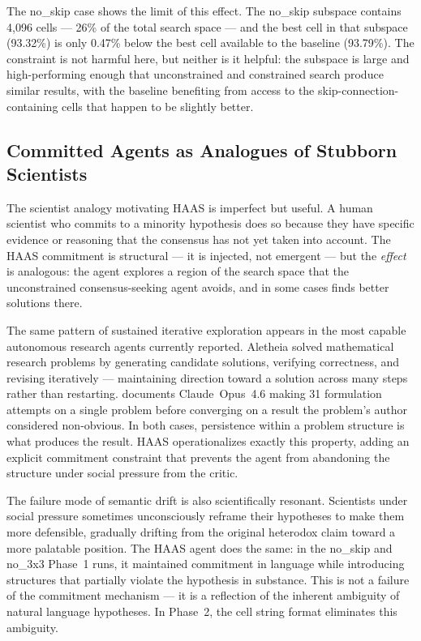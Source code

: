 \documentclass[10pt]{article}
\newcommand{\haas}{\textsc{HAAS}}
\begin{document}
The no\_skip case shows the limit of this effect. The no\_skip subspace contains
4,096 cells --- 26\% of the total search space --- and the best cell in that
subspace (93.32\%) is only 0.47\% below the best cell available to the baseline
(93.79\%). The constraint is not harmful here, but neither is it helpful: the
subspace is large and high-performing enough that unconstrained and constrained
search produce similar results, with the baseline benefiting from access to the
skip-connection-containing cells that happen to be slightly better.

\subsection{Committed Agents as Analogues of Stubborn Scientists}

The scientist analogy motivating \haas{} is imperfect but useful. A human
scientist who commits to a minority hypothesis does so because they have
specific evidence or reasoning that the consensus has not yet taken into account.
The \haas{} commitment is structural --- it is injected, not emergent --- but
the \emph{effect} is analogous: the agent explores a region of the search space
that the unconstrained consensus-seeking agent avoids, and in some cases finds
better solutions there.

The same pattern of sustained iterative exploration appears in the most capable
autonomous research agents currently reported. Aletheia \citep{feng2026aletheia}
solved mathematical research problems by generating candidate solutions,
verifying correctness, and revising iteratively --- maintaining direction toward
a solution across many steps rather than restarting. \citet{knuth2026claude}
documents Claude~Opus~4.6 making 31 formulation attempts on a single problem
before converging on a result the problem's author considered non-obvious. In
both cases, persistence within a problem structure is what produces the result.
\haas{} operationalizes exactly this property, adding an explicit commitment
constraint that prevents the agent from abandoning the structure under social
pressure from the critic.

The failure mode of semantic drift is also scientifically resonant. Scientists
under social pressure sometimes unconsciously reframe their hypotheses to make
them more defensible, gradually drifting from the original heterodox claim toward
a more palatable position. The \haas{} agent does the same: in the no\_skip and
no\_3x3 Phase~1 runs, it maintained commitment in language while introducing
structures that partially violate the hypothesis in substance. This is not a
failure of the commitment mechanism --- it is a reflection of the inherent
ambiguity of natural language hypotheses. In Phase~2, the cell string format
eliminates this ambiguity.
\end{document}
